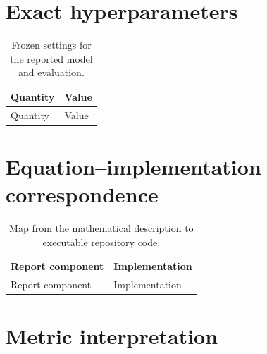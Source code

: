 \documentclass[10pt,a4paper]{article}
\begin{document}
\clearpage
\appendix

\section{Exact hyperparameters}

\begingroup
\small
\begin{longtable}{@{}>{\raggedright\arraybackslash}p{}
>{\raggedright\arraybackslash}p{}@{}}
\caption{Frozen settings for the reported model and evaluation.}
\label{tab:hyperparameters}\\
\toprule
Quantity & Value \\
\midrule
\endfirsthead
\toprule
Quantity & Value \\
\midrule
\endhead

\end{longtable}
\endgroup

\section{Equation--implementation correspondence}

\begingroup
\small
\begin{longtable}{@{}>{\raggedright\arraybackslash}p{}
>{\raggedright\arraybackslash}p{}@{}}
\caption{Map from the mathematical description to executable repository code.}
\label{tab:code-map}\\
\toprule
Report component & Implementation \\
\midrule
\endfirsthead
\toprule
Report component & Implementation \\
\midrule
\endhead

\end{longtable}
\endgroup

\section{Metric interpretation}
\thispagestyle{fancy}
\end{document}
